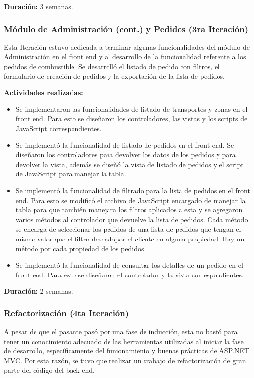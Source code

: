 \textbf{Duración:} 3 semanas.

\subsubsection{Módulo de Administración (cont.) y Pedidos (3ra Iteración)}
Esta Iteración estuvo dedicada a terminar algunas funcionalidades del módulo de Administración en el front end y al desarrollo de la funcionalidad referente a los pedidos de combustible. Se desarrolló el listado de pedido con filtros, el formulario de creación de pedidos y la exportación de la lista de pedidos.

\vspace{0.3cm}
\textbf{Actividades realizadas:}
\begin{itemize}
    \item Se implementaron las funcionalidades de listado de transportes y zonas en el front end. Para esto se diseñaron los controladores, las vistas y los scripts de JavaScript correspondientes.
    \item Se implementó la funcionalidad de listado de pedidos en el front end. Se diseñaron los controladores para devolver los datos de los pedidos y para devolver la vista, además se diseñó la vista de listado de pedidos y el script de JavaScript para manejar la tabla.
    \item Se implementó la funcionalidad de filtrado para la lista de pedidos en el front end. Para esto se modificó el archivo de JavaScript encargado de manejar la tabla para que también manejara los filtros aplicados a esta y se agregaron varios métodos al controlador que devuelve la lista de pedidos. Cada método se encarga de seleccionar los pedidos de una lista de pedidos que tengan el mismo valor que el filtro deseadopor el cliente en alguna propiedad. Hay un método por cada propiedad de los pedidos.
    \item Se implementó la funcionalidad de consultar los detalles de un pedido en el front end. Para esto se diseñaron el controlador y la vista correspondientes.
\end{itemize}

\textbf{Duración:} 2 semanas.

\subsubsection{Refactorización (4ta Iteración)} \label{refactorizacion}
A pesar de que el pasante pasó por una fase de inducción, esta no bastó para tener un conocimiento adecuado de las herramientas utilizadas al iniciar la fase de desarrollo, específicamente del funionamiento y buenas prácticas de ASP.NET MVC. Por esta razón, se tuvo que realizar un trabajo de refactorización de gran parte del código del back end.

